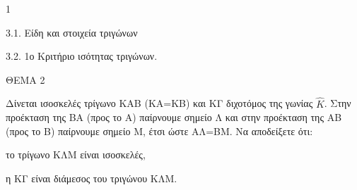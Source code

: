 \begin{ylh}{1}
    \item 3.1. Είδη και στοιχεία τριγώνων
    \item 3.2. 1ο Κριτήριο ισότητας τριγώνων.
\end{ylh}

ΘΕΜΑ 2

Δίνεται ισοσκελές τρίγωνο ΚΑΒ (ΚΑ=ΚΒ) και ΚΓ διχοτόμος της γωνίας $\widehat{K}$. Στην προέκταση της ΒΑ (προς το Α) παίρνουμε σημείο Λ και στην προέκταση της ΑΒ (προς το Β) παίρνουμε σημείο Μ, έτσι ώστε ΑΛ=ΒΜ. Να αποδείξετε ότι:

\begin{alist}
\item το τρίγωνο ΚΛΜ είναι ισοσκελές, 

\item η ΚΓ είναι διάμεσος του τριγώνου ΚΛΜ. 
\end{alist}
